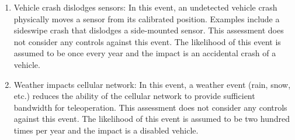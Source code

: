 \documentclass{article}
\begin{document}
\begin{enumerate}
\item Vehicle crash dislodges sensors: In this event, an undetected vehicle crash physically moves a sensor from its calibrated position. Examples include a sideswipe crash that dislodges a side-mounted sensor. This assessment does not consider any controls against this event. The likelihood of this event is assumed to be once every year and the impact is an accidental crash of a vehicle.
\item Weather impacts cellular network: In this event, a weather event (rain, snow, etc.) reduces the ability of the cellular network to provide sufficient bandwidth for teleoperation. This assessment does not consider any controls against this event. The likelihood of this event is assumed to be two hundred times per year and the impact is a disabled vehicle.
\end{enumerate}
\end{document}
